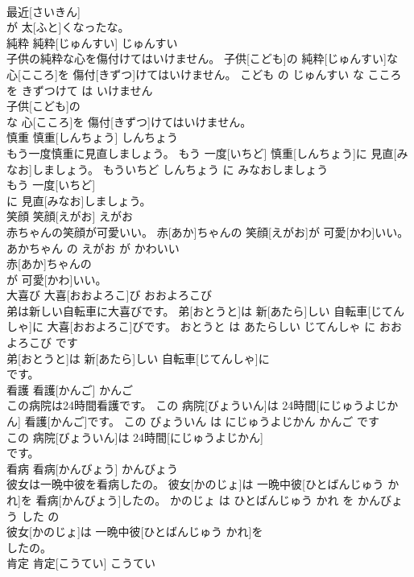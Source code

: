 \documentclass[8pt]{extreport}
\begin{document}
\begin{CJK}{UTF8}{min}
\\	最近[さいきん]
\\	が 太[ふと]くなったな。			
\\	純粋	純粋[じゅんすい]	じゅんすい	
\\	子供の純粋な心を傷付けてはいけません。	子供[こども]の 純粋[じゅんすい]な 心[こころ]を 傷付[きずつ]けてはいけません。	こども の じゅんすい な こころ を きずつけて は いけません	
\\	子供[こども]の
\\	な 心[こころ]を 傷付[きずつ]けてはいけません。			
\\	慎重	慎重[しんちょう]	しんちょう	
\\	もう一度慎重に見直しましょう。	もう 一度[いちど] 慎重[しんちょう]に 見直[みなお]しましょう。	もういちど しんちょう に みなおしましょう	
\\	もう 一度[いちど]
\\	に 見直[みなお]しましょう。			
\\	笑顔	笑顔[えがお]	えがお	
\\	赤ちゃんの笑顔が可愛いい。	赤[あか]ちゃんの 笑顔[えがお]が 可愛[かわ]いい。	あかちゃん の えがお が かわいい	
\\	赤[あか]ちゃんの
\\	が 可愛[かわ]いい。			
\\	大喜び	大喜[おおよろこ]び	おおよろこび	
\\	弟は新しい自転車に大喜びです。	弟[おとうと]は 新[あたら]しい 自転車[じてんしゃ]に 大喜[おおよろこ]びです。	おとうと は あたらしい じてんしゃ に おおよろこび です	
\\	弟[おとうと]は 新[あたら]しい 自転車[じてんしゃ]に
\\	です。			
\\	看護	看護[かんご]	かんご	
\\	この病院は24時間看護です。	この 病院[びょういん]は 24時間[にじゅうよじかん] 看護[かんご]です。	この びょういん は にじゅうよじかん かんご です	
\\	この 病院[びょういん]は 24時間[にじゅうよじかん]
\\	です。			
\\	看病	看病[かんびょう]	かんびょう	
\\	彼女は一晩中彼を看病したの。	彼女[かのじょ]は 一晩中彼[ひとばんじゅう かれ]を 看病[かんびょう]したの。	かのじょ は ひとばんじゅう かれ を かんびょう した の	
\\	彼女[かのじょ]は 一晩中彼[ひとばんじゅう かれ]を
\\	したの。			
\\	肯定	肯定[こうてい]	こうてい	

\end{CJK}
\end{document}
